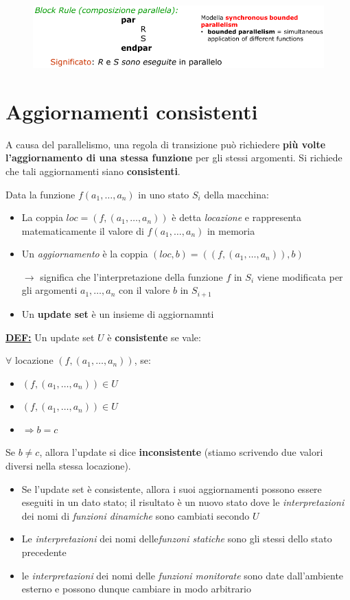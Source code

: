 \begin{figure}[H]
    \includegraphics[width=0.8\linewidth]{chapters/1-asm/images/par.png}
\end{figure}

\section{Aggiornamenti consistenti}
A causa del parallelismo, una regola di transizione può richiedere 
\textbf{più volte l'aggiornamento di una stessa funzione} per gli 
stessi argomenti. Si richiede che tali aggiornamenti siano \textbf{consistenti}.

\noindent Data la funzione $f(a_1, \dots, a_n)$ in uno stato $S_i$ della macchina:
\begin{itemize}
    \item La coppia $loc = (f, (a_1, \dots, a_n))$ è detta \textit{locazione} e rappresenta
    matematicamente il valore di $f(a_1, \dots, a_n)$ in memoria 
    \item Un \textit{aggiornamento} è la coppia $(loc, b)=((f,(a_1,\dots,a_n)), b)$
    
    $\rightarrow$ significa che l'interpretazione della funzione $f$ in $S_i$ viene modificata 
    per gli argomenti $a_1, \dots, a_n$ con il valore $b$ in $S_{i+1}$
    \item Un \textbf{update set} è un insieme di aggiornamnti
\end{itemize}


\noindent \underline{\textbf{DEF:}} Un update set $U$ è \textbf{consistente}
se vale:

\noindent $\forall$ locazione $(f, (a_1, \dots, a_n))$, se:
\begin{itemize}
    \item $(f, (a_1, \dots, a_n)) \in U$
    \item $(f, (a_1, \dots, a_n)) \in U$ 
    \item $\Rightarrow b = c$
\end{itemize}


\noindent Se $b \neq c$, allora l'update si dice \textbf{inconsistente} (stiamo scrivendo 
due valori diversi nella stessa locazione).

\begin{itemize}
    \item Se l'update set è consistente, allora i suoi aggiornamenti possono 
    essere eseguiti in un dato stato; il risultato è un nuovo stato dove le 
    \textit{interpretazioni} dei nomi di \textit{funzioni dinamiche} sono cambiati 
    secondo $U$
    \item Le \textit{interpretazioni} dei nomi delle\textit{funzoni statiche} sono gli stessi 
    dello stato precedente 
    \item le \textit{interpretazioni} dei nomi delle \textit{funzioni monitorate} sono date dall'ambiente esterno 
    e possono dunque cambiare in modo arbitrario
\end{itemize}


